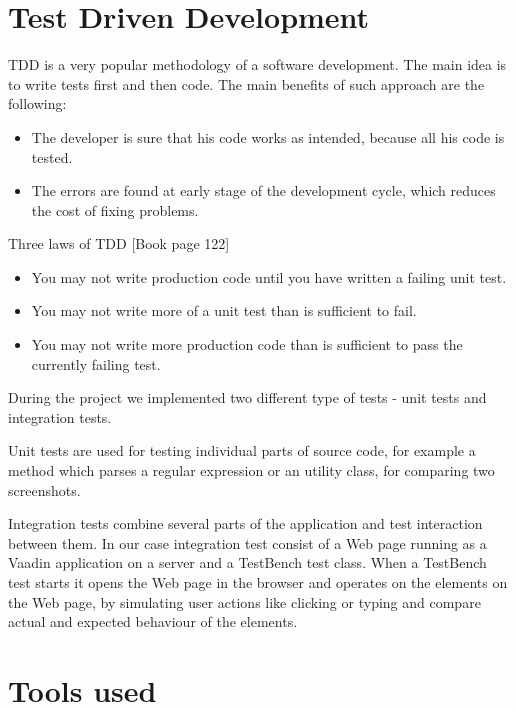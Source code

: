   \section{Test Driven Development}
  TDD is a very popular methodology of a software development. The main idea is
  to write tests first and then code. The main benefits of such approach are
  the following:
      \begin{itemize}
        \item The developer is sure that his code works as intended, because all
        his code is tested.
        \item The errors are found at early stage of the development cycle, which
        reduces the cost of fixing problems.
      \end{itemize}
      
      Three laws of TDD \cite[pp122]{cleancode}[Book page 122]
        \begin{itemize}
          \item You may not write production code until you have written a failing unit test.
          \item You may not write more of a unit test than is sufficient to fail.
          \item You may not write more production code than is sufficient to pass the currently failing test.
        \end{itemize}
    
  During the project we implemented two different type of tests - unit tests and
  integration tests. 
  
  Unit tests are used for testing individual parts of source
  code, for example a method which parses a regular expression or an utility
  class, for comparing two screenshots.
  
  Integration tests combine several parts of the application and test 
  interaction between them. In our case integration test consist of a Web page
  running as a Vaadin application on a server and a TestBench test class. When
  a TestBench test starts it opens the Web page in the browser and operates on
  the elements on the Web page, by simulating user actions like clicking or typing
  and compare actual and expected behaviour of the elements. 
      
  \section {Tools used}
  \label{sec:toolsused}
  
